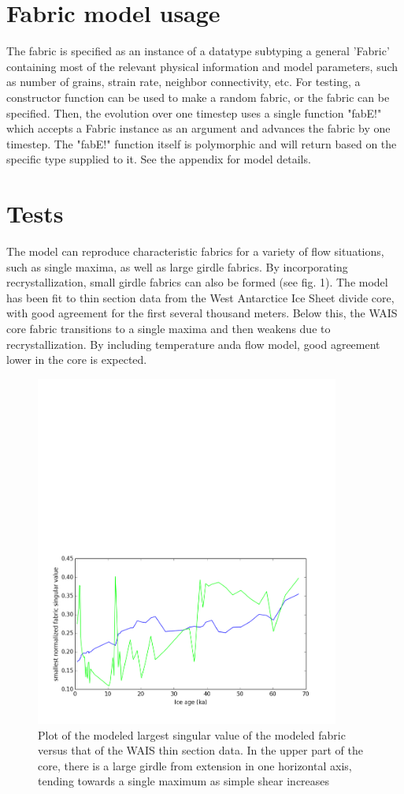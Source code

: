 \documentclass{article}
\begin{document}
\section{Fabric model usage}
The fabric is specified as an instance of a datatype subtyping a general 'Fabric' containing most of the relevant physical information and model parameters, such as number of grains, strain rate, neighbor connectivity, etc. For testing, a constructor function can be used to make a random fabric, or the fabric can be specified. Then, the evolution over one timestep uses a single function "fabE!" which accepts a Fabric instance as an argument and advances the fabric by one timestep. The "fabE!" function itself is polymorphic and will return based on the specific type supplied to it. See the appendix for model details.

\section{Tests}
The model can reproduce characteristic fabrics for a variety of flow situations, such as single maxima, as well as large girdle fabrics. By incorporating recrystallization, small girdle fabrics can also be formed (see fig. 1). The model has been fit to thin section data from the West Antarctice Ice Sheet divide core, with good agreement for the first several thousand meters. Below this, the WAIS core fabric transitions to a single maxima and then weakens due to recrystallization. By including temperature anda flow model, good agreement lower in the core is expected.
\begin{figure}
\caption{Plot of the modeled largest singular value of the modeled fabric versus that of the WAIS thin section data. In the upper part of the core, there is a large girdle from extension in one horizontal axis, tending towards a single maximum as simple shear increases}
\includegraphics[width=10cm]{waisfit}
\end{figure}
\end{document}
